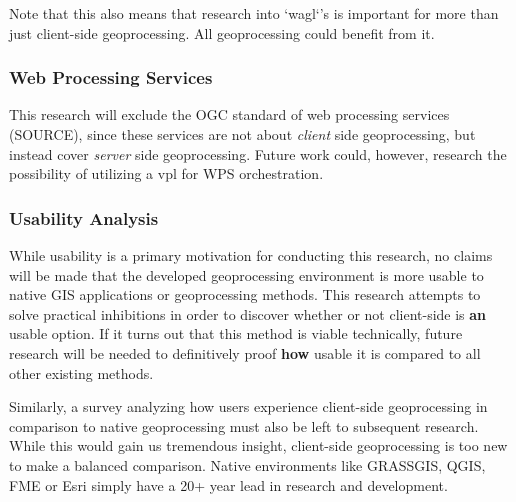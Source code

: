 Note that this also means that research into `wagl`'s is important for more than just client-side geoprocessing. All geoprocessing could benefit from it.



\subsubsection*{Web Processing Services} %

This research will exclude the OGC standard of web processing services (SOURCE), since these services are not about \emph{client} side geoprocessing, but instead cover \emph{server} side geoprocessing. 
Future work could, however, research the possibility of utilizing a vpl for WPS orchestration. 



\subsubsection*{Usability Analysis} %

While usability is a primary motivation for conducting this research, no claims will be made that the developed geoprocessing environment is more usable to native GIS applications or geoprocessing methods. This research attempts to solve practical inhibitions in order to discover whether or not client-side is \textbf{an} usable option. If it turns out that this method is viable technically, future research will be needed to definitively proof \textbf{how} usable it is compared to all other existing methods.  


Similarly, a survey analyzing how users experience client-side geoprocessing in comparison to native geoprocessing must also be left to subsequent research. While this would gain us tremendous insight, client-side geoprocessing is too new to make a balanced comparison. Native environments like GRASSGIS, QGIS, FME or Esri simply have a 20+ year lead in research and development. 
